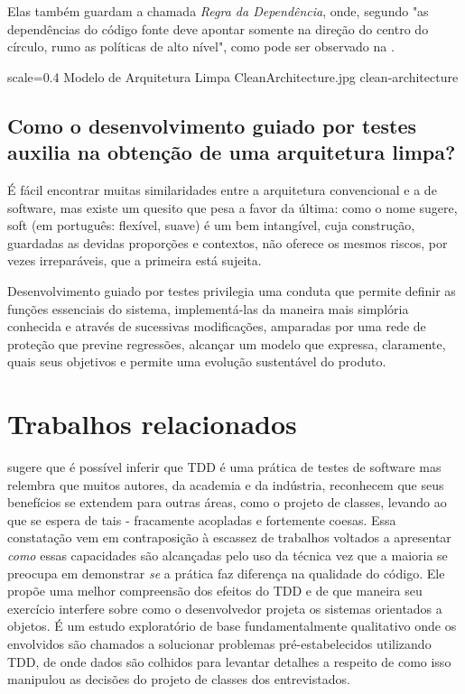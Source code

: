   Elas também guardam a chamada \emph{Regra da Dependência}, onde, segundo  "as dependências do código fonte deve apontar somente na direção do centro do círculo, rumo as políticas de alto nível", como pode ser observado na .

  \imagem
    {scale=0.4}
    {Modelo de Arquitetura Limpa}
    {CleanArchitecture.jpg}
    {clean-architecture}
    {\cite[pág. 197]{Martin2018}}

  \subsection{Como o desenvolvimento guiado por testes auxilia na obtenção de uma arquitetura limpa?}

    É fácil encontrar muitas similaridades entre a arquitetura convencional e a de software, mas existe um quesito que pesa a favor da última: como o nome sugere, soft (em português: flexível, suave) é um bem intangível, cuja construção, guardadas as devidas proporções e contextos, não oferece os mesmos riscos, por vezes irreparáveis, que a primeira está sujeita.

    Desenvolvimento guiado por testes privilegia uma conduta que permite definir as funções essenciais do sistema, implementá-las da maneira mais simplória conhecida e através de sucessivas modificações, amparadas por uma rede de proteção que previne regressões, alcançar um modelo que expressa, claramente, quais seus objetivos e permite uma evolução sustentável do produto.

\section{Trabalhos relacionados}

   sugere que é possível inferir que TDD é uma prática de testes de software mas relembra que muitos autores, da academia e da indústria, reconhecem que seus benefícios se extendem para outras áreas, como o projeto de classes, levando ao que se espera de tais - fracamente acopladas e fortemente coesas. Essa constatação vem em contraposição à escassez de trabalhos voltados a apresentar \emph{como} essas capacidades são alcançadas pelo uso da técnica vez que a maioria se preocupa em demonstrar \emph{se} a prática faz diferença na qualidade do código. Ele propõe uma melhor compreensão dos efeitos do TDD e de que maneira seu exercício interfere sobre como o desenvolvedor projeta os sistemas orientados a objetos. É um estudo exploratório de base fundamentalmente qualitativo onde os envolvidos são chamados a solucionar problemas pré-estabelecidos utilizando TDD, de onde dados são colhidos para levantar detalhes a respeito de como isso manipulou as decisões do projeto de classes dos entrevistados.

